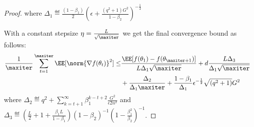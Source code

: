 \documentclass[11pt]{article}
\begin{document}
\begin{proof}
where $\Delta_1 \eqdef \frac{(1-\beta_1)}{2} (\epsilon + \frac{(q^2+1)G^2}{1 - \beta_2})^{-\frac{1}{2}}$

With a constant stepsize $\eta = \frac{L}{\sqrt{\maxiter}}$ we get the final convergence bound as follows:
\begin{equation}
\begin{split}
 \frac{1}{\maxiter}\sum_{t=1}^{\maxiter} \EE[\norm{\nabla f(\theta_t)}^2] \leq & \frac{\EE[ f(\theta_{1}) - f(\theta_{\maxiter+1})]}{L \Delta_1 \sqrt{\maxiter}} + 
d\frac{L \Delta_3}{\Delta_1 \sqrt{\maxiter}} \\
& + \frac{\Delta_2}{ \Delta_1\maxiter} +\frac{1-\beta_1}{\Delta_1}  \epsilon^{-\frac{1}{2}} \sqrt{(q^2+1)}G^2 
\end{split}
\end{equation}
where $\Delta_2 \eqdef q^2 + \sum_{k=t+1}^\infty  \beta_1^{k-t+2}\frac{G^2 }{\epsilon 2n^2}$ and $\Delta_3 \eqdef \left(\frac{L}{2} + 1+ \frac{\beta_1L}{1-\beta_1} \right) (1-\beta_2)^{-1} (1 - \frac{\beta_1^{2}}{\beta_2})^{-1}$.


\end{proof}
\end{document}

